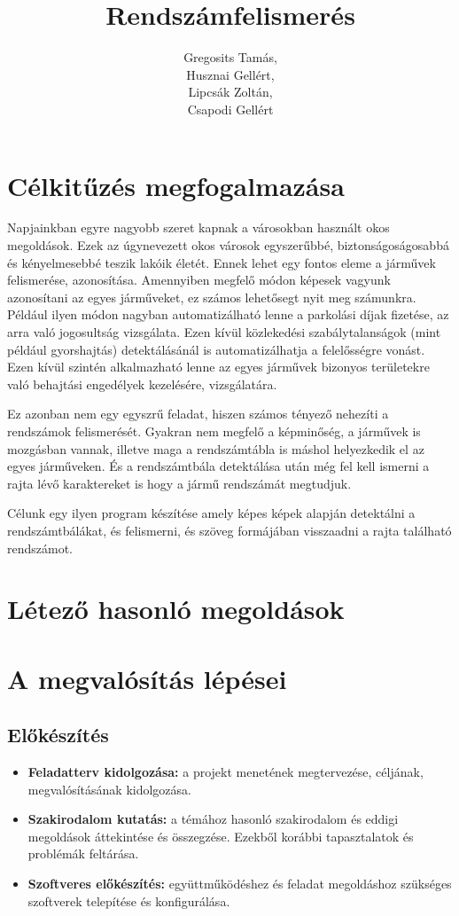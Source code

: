 \documentclass[12pt,a4paper]{article}
\author{Gregosits Tamás,\\Husznai Gellért,\\Lipcsák Zoltán,\\Csapodi Gellért}
\title{Rendszámfelismerés}
\begin{document}
\maketitle
\newpage
\tableofcontents
\newpage
    \section{Célkitűzés megfogalmazása}
    Napjainkban egyre nagyobb szeret kapnak a városokban használt okos megoldások.
    Ezek az úgynevezett okos városok egyszerűbbé, biztonságoságosabbá és kényelmesebbé teszik lakóik életét.
    Ennek lehet egy fontos eleme a járművek felismerése, azonosítása. 
    Amennyiben megfelő módon képesek vagyunk azonosítani az egyes járműveket, ez számos lehetősegt nyit meg számunkra.
    Például ilyen módon nagyban automatizálható lenne a parkolási díjak fizetése, 
    az arra való jogosultság vizsgálata. Ezen kívül közlekedési szabálytalanságok (mint például gyorshajtás)
    detektálásánál is automatizálhatja a felelősségre vonást. Ezen kívül szintén alkalmazható
    lenne az egyes járművek bizonyos területekre való behajtási engedélyek kezelésére, vizsgálatára.

    Ez azonban nem egy egyszrű feladat, hiszen számos tényező nehezíti a rendszámok felismerését.
    Gyakran nem megfelő a képminőség, a járművek is mozgásban vannak, illetve maga a rendszámtábla is 
    máshol helyezkedik el az egyes járműveken. És a rendszámtbála detektálása után még fel kell 
    ismerni a rajta lévő karaktereket is hogy a jármű rendszámát megtudjuk.

    Célunk egy ilyen program készítése amely képes képek alapján detektálni a rendszámtbálákat,
    és felismerni, és szöveg formájában visszaadni a rajta található rendszámot.
    \section{Létező hasonló megoldások}
    \section{A megvalósítás lépései}
    \subsection{Előkészítés}
    \begin{itemize}
        \item \textbf{Feladatterv kidolgozása:} a projekt menetének megtervezése, céljának, megvalósításának kidolgozása.
        \item \textbf{Szakirodalom kutatás:} a témához hasonló szakirodalom és eddigi megoldások áttekintése és összegzése. Ezekből korábbi tapasztalatok és problémák feltárása.
        \item \textbf{Szoftveres előkészítés:} együttműködéshez és feladat megoldáshoz szükséges szoftverek telepítése és konfigurálása.
    \end{itemize}
    
\end{document}
